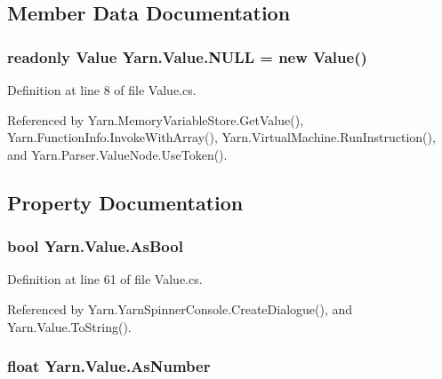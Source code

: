 \subsection{Member Data Documentation}
\hypertarget{a00181_a1ed2964965baca8621c45efa23f37660}{
\subsubsection[{N\-U\-L\-L}]{\setlength{\rightskip}{0pt plus 5cm}readonly {\bf Value} Yarn.\-Value.\-N\-U\-L\-L = new {\bf Value}()\hspace{0.3cm}{\ttfamily [static]}}}\label{a00181_a1ed2964965baca8621c45efa23f37660}


Definition at line 8 of file Value.\-cs.



Referenced by Yarn.\-Memory\-Variable\-Store.\-Get\-Value(), Yarn.\-Function\-Info.\-Invoke\-With\-Array(), Yarn.\-Virtual\-Machine.\-Run\-Instruction(), and Yarn.\-Parser.\-Value\-Node.\-Use\-Token().



\subsection{Property Documentation}
\hypertarget{a00181_a5805faef3b3d376090ff096d6dd6c064}{
\subsubsection[{As\-Bool}]{\setlength{\rightskip}{0pt plus 5cm}bool Yarn.\-Value.\-As\-Bool\hspace{0.3cm}{\ttfamily [get]}}}\label{a00181_a5805faef3b3d376090ff096d6dd6c064}


Definition at line 61 of file Value.\-cs.



Referenced by Yarn.\-Yarn\-Spinner\-Console.\-Create\-Dialogue(), and Yarn.\-Value.\-To\-String().

\hypertarget{a00181_a751419743761562bf902246d6e6a3c0a}{
\subsubsection[{As\-Number}]{\setlength{\rightskip}{0pt plus 5cm}float Yarn.\-Value.\-As\-Number\hspace{0.3cm}{\ttfamily [get]}}}\label{a00181_a751419743761562bf902246d6e6a3c0a}



